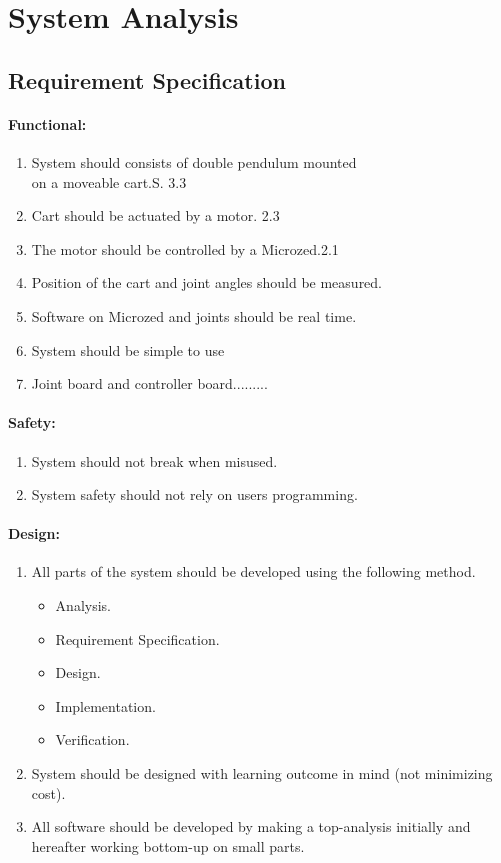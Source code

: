 \section{System Analysis}
\lipsum[5]


\subsection{Requirement Specification}
\label{sub:requirements}

\paragraph{Functional:}
\begin{enumerate}	\item System should consists of double pendulum mounted\\ on a moveable cart.\hfill S. 3.3
	\item Cart should be actuated by a motor. \hfill 2.3
	\item The motor should be controlled by a Microzed.\hfill 2.1
	\item Position of the cart and joint angles should be measured.
	\item Software on Microzed and joints should be real time.
	\item System should be simple to use
	\item Joint board and controller board.........
\end{enumerate}

\paragraph{Safety:}
\begin{enumerate}[resume]
	\item System should not break when misused.
	\item System safety should not rely on users programming.
\end{enumerate}

\paragraph{Design:}
\begin{enumerate}[resume]
	\item All parts of the system should be developed using the following method. 
	\begin{itemize}
	 	\item Analysis.
	 	\item Requirement Specification.
	 	\item Design.
	 	\item Implementation.
	 	\item Verification.
	 \end{itemize} 
	 \item System should be designed with learning outcome in mind (not minimizing cost).
	 \item All software should be developed by making a top-analysis initially and hereafter working bottom-up on small parts. 
\end{enumerate}